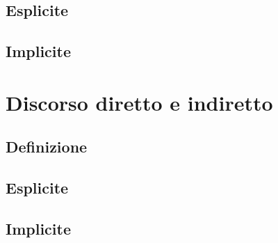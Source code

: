 \documentclass[a4paper,twoside,11pt,chapterprefix=false,bibliography=totocnumbered,listof=flat]{scrbook}
\begin{document}
\section{Esplicite}\label{esplicite-6}

\section{Implicite}\label{implicite-6}

\chapter{Discorso diretto e
indiretto}\label{discorso-diretto-e-indiretto}

\section{Definizione}\label{definizione-5}

\section{Esplicite}\label{esplicite-7}

\section{Implicite}\label{implicite-7}


\end{document}
